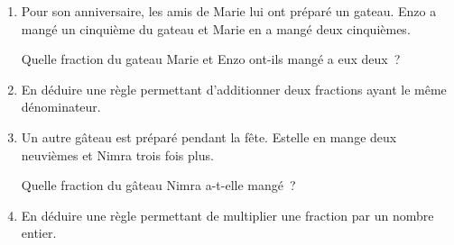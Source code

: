 \documentclass[activite]{thedocument}
\begin{document}
    \begin{enumerate}
        \item Pour son anniversaire, les amis de Marie
        lui ont préparé un gateau. Enzo a mangé un cinquième
        du gateau et Marie en a mangé deux cinquièmes.\par
        \vskip5pt\noindent
        Quelle fraction du gateau Marie et Enzo ont-ils mangé
        a eux deux~?
        \answerspace{30pt}
        \item En déduire une règle permettant d'additionner deux
        fractions ayant le même dénominateur.
        \answerspace{50pt}
        \item Un autre gâteau est préparé pendant la fête. Estelle
        en mange deux neuvièmes et Nimra trois fois plus.\par
        \vskip5pt\noindent
        Quelle fraction du gâteau Nimra a-t-elle mangé~?
        \answerspace{30pt}
        \item En déduire une règle permettant de multiplier une
        fraction par un nombre entier.
        \answerspace{50pt}
    \end{enumerate}
\end{document}
